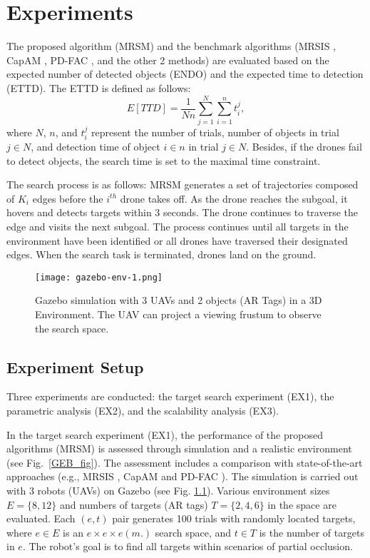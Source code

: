 \chapter{Experiments}
The proposed algorithm (MRSM) and the benchmark algorithms (MRSIS \cite{li2024mrsis}, CapAM \cite{paull2022learning}, PD-FAC \cite{sheng2022pd}, and the other 2 methods) are evaluated based on the expected number of detected objects (ENDO) and the expected time to detection (ETTD).
The ETTD is defined as follows:
\begin{equation*}
E[TTD] = \frac{1}{Nn}\sum_{j=1}^{N}\sum_{i=1}^{n}t^j_i,
\end{equation*}
where $N$, $n$, and $t^j_i$ represent the number of trials, number of objects in trial $j \in N$, and detection time of object $i \in n$ in trial $j \in N$.
Besides, if the drones fail to detect objects, the search time is set to the maximal time constraint.

The search process is as follows: MRSM generates a set of trajectories composed of $K_i$ edges before the $i^{th}$ drone takes off. As the drone reaches the subgoal, it hovers and detects targets within 3 seconds. The drone continues to traverse the edge and visits the next subgoal. The process continues until all targets in the environment have been identified or all drones have traversed their designated edges.
When the search task is terminated, drones land on the ground.

\begin{figure}[htbp]
\centerline{\texttt{[image: gazebo-env-1.png]}}
\caption{
Gazebo simulation with 3 UAVs and 2 objects (AR Tags) in a 3D Environment.
The UAV can project a viewing frustum to observe the search space.
}
\label{environment}
\end{figure}

\section{Experiment Setup}
Three experiments are conducted: the target search experiment (EX1), the parametric analysis (EX2), and the scalability analysis (EX3).

In the target search experiment (EX1), the performance of the proposed algorithms (MRSM) is assessed through simulation and a realistic environment (see Fig.~\ref{GEB_fig}).
The assessment includes a comparison with state-of-the-art approaches (e.g., MRSIS \cite{li2024mrsis}, CapAM \cite{paull2022learning} and PD-FAC \cite{sheng2022pd}).
The simulation is carried out with 3 robots (UAVs) on Gazebo (see Fig. \ref{environment}). Various environment sizes $E=\{8,12\}$ and numbers of targets (AR tags) $T=\{2,4,6\}$ in the space are evaluated.
Each $(e,t)$ pair generates 100 trials with randomly located targets,
where $e \in E$ is an $e \times e \times e (m.)$ search space, and $t \in T$ is the number of targets in $e$.
The robot's goal is to find all targets within scenarios of partial occlusion.

